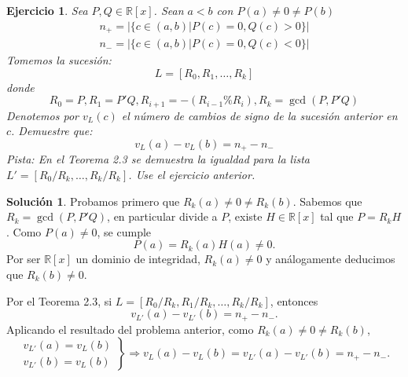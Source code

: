 \documentclass[10pt]{article}
\newtheorem{ejer}{Ejercicio}
\theoremstyle{definition}
\newtheorem*{sol}{Solución}
\newcommand{\RRx}{\mathbb{R}[x]}
\begin{document}
\begin{ejer} Sea $P,Q\in\RRx$. Sean $a<b$ con $P(a)\neq 0\neq P(b)$
\[\begin{array}{c}
n_+ = |\{c\in (a,b)| P(c)=0, Q(c)>0\}|\\
n_{-}=|\{c\in (a,b)| P(c)=0, Q(c)<0\}|
\end{array}\]
Tomemos la sucesión:
$$L = [R_0,R_1,\ldots, R_k]$$
donde
\[R_0=P, R_1=P'Q,R_{i+1}=-(R_{i-1}\% R_i), R_k=\gcd(P,P'Q)\]
Denotemos por $v_L(c)$ el número de cambios de signo de la sucesión anterior en $c$. Demuestre que:
$$v_L(a)-v_L(b)=n_{+}-n_{-}$$
Pista: En el Teorema 2.3 se demuestra la igualdad para la lista $L'=[R_0/R_k,\ldots, R_k/R_k]$. Use el ejercicio anterior.
\end{ejer}
\begin{sol} Probamos primero que $R_k(a)\neq 0\neq R_k(b)$. Sabemos que $R_k = \gcd(P,P'Q)$, en particular divide a $P$, existe $H\in\RRx$ tal que $P=R_kH$. Como $P(a)\neq 0$, se cumple \[P(a)=R_k(a)H(a)\neq 0.\]
Por ser $\RRx$ un dominio de integridad, $R_k(a)\neq 0$ y análogamente deducimos que $R_k(b)\neq 0$.

Por el Teorema 2.3, si $L=[R_0/R_k,R_1/R_k,\ldots, R_k/R_k]$, entonces
\[v_{L'}(a)-v_{L'}(b)=n_+-n_-.\]
Aplicando el resultado del problema anterior, como $R_k(a)\neq 0\neq R_k(b)$,
\[\left.\begin{array}{c}
    v_{L'}(a) = v_{L}(b)\\
    v_{L'}(b) = v_{L}(b) 
\end{array}\right\}\Longrightarrow v_L(a)-v_L(b)=v_{L'}(a)-v_{L'}(b)=n_+-n_-.
\]
\end{sol}
\end{document}

